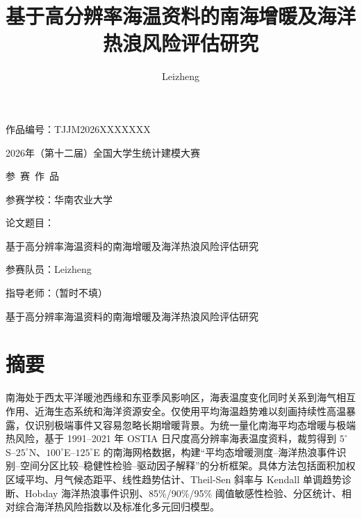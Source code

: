 \documentclass[UTF8,a4paper,zihao=-4,fontset=fandol]{ctexart}
\title{基于高分辨率海温资料的南海增暖及海洋热浪风险评估研究}
\author{Leizheng}
\date{}
\newif\ifanonymous
\begin{document}
\ifanonymous\else
\begin{titlepage}
  \centering
  \vspace*{0.5cm}
  {\heiti{} 作品编号：TJJM2026XXXXXXX\par}
  \vspace{2.2cm}
  {\songti{} 2026年（第十二届）全国大学生统计建模大赛\par}
  \vspace{0.7cm}
  {\songti{} 参\ 赛\ 作\ 品\par}
  \vspace{2.3cm}
  {\fangsong{} 参赛学校：华南农业大学\par}
  \vspace{0.8cm}
  {\fangsong{} 论文题目：\par}
  \vspace{0.3cm}
  {\songti{} 基于高分辨率海温资料的南海增暖及海洋热浪风险评估研究\par}
  \vspace{0.8cm}
  {\fangsong{} 参赛队员：Leizheng\par}
  \vspace{0.8cm}
  {\fangsong{} 指导老师：（暂时不填）\par}
  \vfill
\end{titlepage}
\fi

\begin{center}
{\songti{} 基于高分辨率海温资料的南海增暖及海洋热浪风险评估研究}
\end{center}

\section*{摘要}
南海处于西太平洋暖池西缘和东亚季风影响区，海表温度变化同时关系到海气相互作用、近海生态系统和海洋资源安全。仅使用平均海温趋势难以刻画持续性高温暴露，仅识别极端事件又容易忽略长期增暖背景。为统一量化南海平均态增暖与极端热风险，基于 1991--2021 年 OSTIA 日尺度高分辨率海表温度资料，裁剪得到 $5^{\circ}$S--$25^{\circ}$N、$100^{\circ}$E--$125^{\circ}$E 的南海网格数据，构建“平均态增暖测度--海洋热浪事件识别--空间分区比较--稳健性检验--驱动因子解释”的分析框架。具体方法包括面积加权区域平均、月气候态距平、线性趋势估计、Theil-Sen 斜率与 Kendall 单调趋势诊断、Hobday 海洋热浪事件识别、85\%/90\%/95\% 阈值敏感性检验、分区统计、相对综合海洋热风险指数以及标准化多元回归模型。
\end{document}
